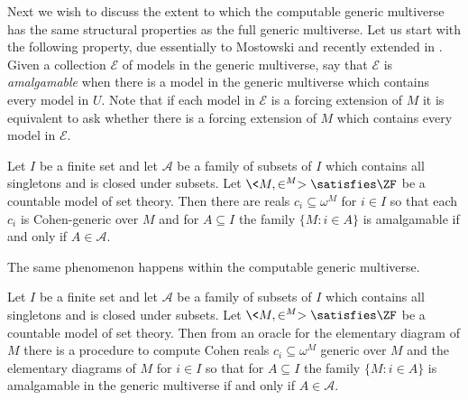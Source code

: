 \documentclass{amsart}
\begin{document}
 Next we wish to discuss the extent to which the computable generic multiverse has the same structural properties as the full generic multiverse. Let us start with the following property, due essentially to Mostowski \cite{Mostowski1976} and recently extended in \cite{HHKVW2019}. Given a collection $\mathcal E$ of models in the generic multiverse, say that $\mathcal E$ is \emph{amalgamable} when there is a model in the generic multiverse which contains every model in $U$. Note that if each model in $\mathcal E$ is a forcing extension of $M$ it is equivalent to ask whether there is a forcing extension of $M$ which contains every model in $\mathcal E$.
 
 \begin{theorem}
 Let $I$ be a finite set and let $\mathcal A$ be a family of subsets of $I$ which contains all singletons and is closed under subsets. Let $\<M,\in^M>\satisfies\ZF$ be a countable  model of set theory. Then there are reals $c_i \subseteq \omega^M$ for $i \in I$ so that each $c_i$ is Cohen-generic over $M$ and for $A \subseteq I$ the family $\{M : i \in A\}$ is amalgamable if and only if $A \in \mathcal A$.
 \end{theorem}
 
 The same phenomenon happens within the computable generic multiverse.
 
 \begin{theorem}
 Let $I$ be a finite set and let $\mathcal A$ be a family of subsets of $I$ which contains all singletons and is closed under subsets. Let $\<M,\in^M>\satisfies\ZF$ be a countable model of set theory. Then from an oracle for the elementary diagram of $M$ there is a procedure to compute Cohen reals $c_i \subseteq \omega^M$ generic over $M$ and the elementary diagrams of $M$ for $i \in I$ so that for $A \subseteq I$ the family $\{M : i \in A\}$ is amalgamable in the generic multiverse if and only if $A \in \mathcal A$.
 \end{theorem}
 
\end{document}
